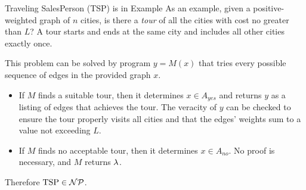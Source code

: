 \begin{frame}{Traveling SalesPerson (TSP) is in }{Example}
As an example, given a positive-weighted graph of $n$ cities, is there a \emph{tour} of all the cities with cost no greater than $L$?  A tour starts and ends at the same city and includes all other cities exactly once.

This problem can be solved by program $y=M(x)$ that tries every possible sequence of edges in the provided graph $x$.
\begin{itemize}
    \item If $M$ finds a suitable tour, then it determines $x\in A_{yes}$ and returns $y$ as a listing of edges that achieves the tour.  The veracity of $y$ can be checked to ensure the tour properly visits all cities and that the edges' weights sum to a value not exceeding $L$.
    \item If $M$ finds no acceptable tour, then it determines $x \in A_{no}$.  No proof is necessary, and $M$ returns $\lambda{}$.
\end{itemize}
Therefore $\mbox{TSP}\in \mathcal{NP}$.
    
\end{frame}